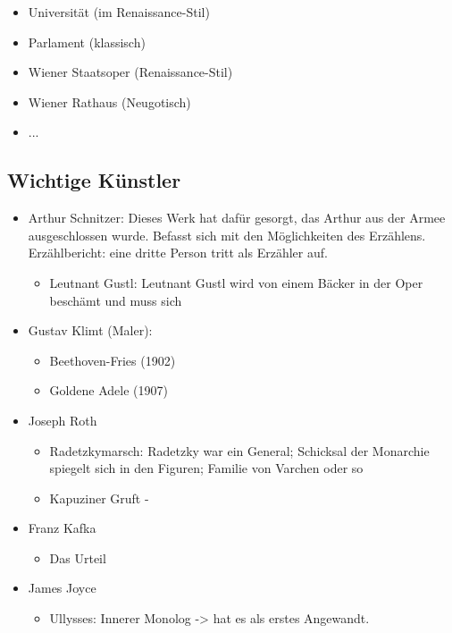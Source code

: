 \documentclass[12pt,a4paper]{article}
\begin{document}
\begin{itemize}
\item Universität (im Renaissance-Stil)
\item Parlament (klassisch)
\item Wiener Staatsoper (Renaissance-Stil)
\item Wiener Rathaus (Neugotisch)
\item ...
\end{itemize}

\subsection{Wichtige Künstler}

\begin{itemize}
\item Arthur Schnitzer: Dieses Werk hat dafür gesorgt, das Arthur aus der Armee ausgeschlossen wurde. Befasst sich mit den Möglichkeiten des Erzählens. Erzählbericht: eine dritte Person tritt als Erzähler auf.
	\begin{itemize}
	\item Leutnant Gustl: Leutnant Gustl wird von einem Bäcker in der Oper beschämt und muss sich
	\end{itemize}
\item Gustav Klimt (Maler):
	\begin{itemize}
	\item Beethoven-Fries (1902)
	\item Goldene Adele (1907)
	\end{itemize}
\item Joseph Roth
	\begin{itemize}
		\item Radetzkymarsch: Radetzky war ein General; Schicksal der Monarchie spiegelt sich in den Figuren; Familie von Varchen oder so
	\item Kapuziner Gruft - 
	\end{itemize}
\item Franz Kafka
	\begin{itemize}
	\item Das Urteil
	\end{itemize}
\end{itemize}
\begin{itemize}
\item James Joyce
	\begin{itemize}
	\item Ullysses: Innerer Monolog -> hat es als erstes Angewandt.
	\end{itemize}
\end{itemize}
\end{document}
